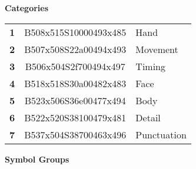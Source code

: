 \documentclass{article}
\begin{document}
\newfontfamily{}
\newfontfamily{}
\newlength{\signsize}
\setlength{\signsize}{10pt}
\pagestyle{empty}

\begin{multicols}{3}
\noindent
\textbf{Categories}

\noindent
\begin{tabular}{r@{}c@{}l}
\textbf{1}&B508x515S10000493x485&Hand\\
\textbf{2}&B507x508S22a00494x493&Movement\\
\textbf{3}&B506x504S2f700494x497&Timing\\
\textbf{4}&B518x518S30a00482x483&Face\\
\textbf{5}&B523x506S36e00477x494&Body\\
\textbf{6}&B522x520S38100479x481&Detail\\
\textbf{7}&B537x504S38700463x496&Punctuation\\
\end{tabular}

\noindent
\textbf{Symbol Groups}


\end{multicols}
\end{document}
